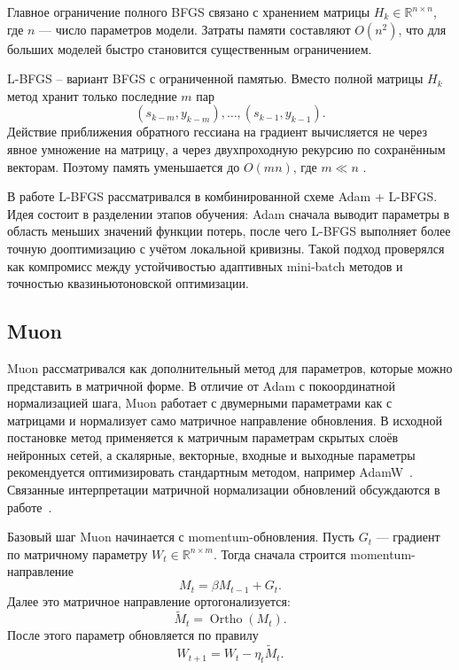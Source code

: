 Главное ограничение полного BFGS связано с хранением матрицы \(H_k\in\mathbb R^{n\times n}\), где \(n\) --- число параметров модели. Затраты памяти составляют \(O(n^2)\), что для больших моделей быстро становится существенным ограничением.

L-BFGS -- вариант BFGS с ограниченной памятью. Вместо полной матрицы \(H_k\) метод хранит только последние \(m\) пар
\begin{equation}
    (s_{k-m},y_{k-m}),\ldots,(s_{k-1},y_{k-1}).
\end{equation}
Действие приближения обратного гессиана на градиент вычисляется не через явное умножение на матрицу, а через двухпроходную рекурсию по сохранённым векторам. Поэтому память уменьшается до \(O(mn)\), где \(m\ll n\) \cite{nocedal2006numerical}.

В работе L-BFGS рассматривался в комбинированной схеме Adam + L-BFGS. Идея состоит в разделении этапов обучения: Adam сначала выводит параметры в область меньших значений функции потерь, после чего L-BFGS выполняет более точную дооптимизацию с учётом локальной кривизны. Такой подход проверялся как компромисс между устойчивостью адаптивных mini-batch методов и точностью квазиньютоновской оптимизации.

\subsection{Muon}

Muon рассматривался как дополнительный метод для параметров, которые можно представить в матричной форме. В отличие от Adam с покоординатной нормализацией шага, Muon работает с двумерными параметрами как с матрицами и нормализует само матричное направление обновления. В исходной постановке метод применяется к матричным параметрам скрытых слоёв нейронных сетей, а скалярные, векторные, входные и выходные параметры рекомендуется оптимизировать стандартным методом, например AdamW~\cite{jordan2024muon}. Связанные интерпретации матричной нормализации обновлений обсуждаются в работе~\cite{bernstein2024oldoptimizer}.

Базовый шаг Muon начинается с momentum-обновления. Пусть \(G_t\) --- градиент по матричному параметру \(W_t\in\mathbb R^{n\times m}\). Тогда сначала строится momentum-направление
\begin{equation}
    M_t
    =
    \beta M_{t-1}
    +
    G_t.
\end{equation}
Далее это матричное направление ортогонализуется:
\begin{equation}
    \widetilde M_t
    =
    \operatorname{Ortho}(M_t).
\end{equation}
После этого параметр обновляется по правилу
\begin{equation}
    W_{t+1}
    =
    W_t
    -
    \eta_t
    \widetilde M_t.
\end{equation}

